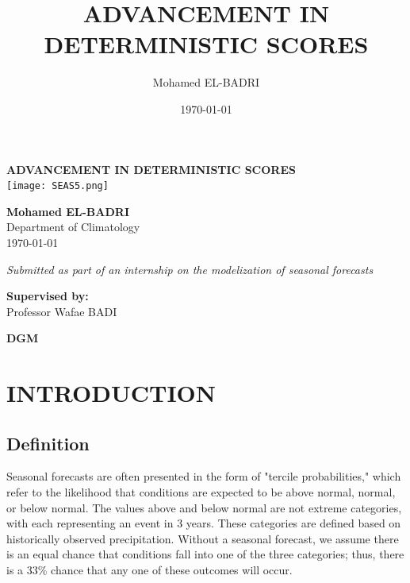 \documentclass[11pt]{article}
\title{\textbf{ADVANCEMENT IN DETERMINISTIC SCORES}}
\author{Mohamed EL-BADRI}
\date{\today}
\begin{document}
\begin{titlepage}
    \centering
    \vspace*{5cm} %
    
    {\Large\textbf{ADVANCEMENT IN DETERMINISTIC SCORES}}\\[1.5cm]
    
    \texttt{[image: SEAS5.png]} %
    
    \vfill
    
    \textbf{\Large Mohamed EL-BADRI}\\[1cm]
    
    \Large Department of Climatology \\[0.3cm]
    
    \Large \today
    
    \vspace*{2cm}
    
\large \textit{Submitted as part of an internship on the modelization of seasonal forecasts}\\[1cm]

    
    \vfill
    
    \large \textbf{Supervised by:} \\
    Professor Wafae BADI\\
    
    \vspace{1cm}
    
    \textbf{DGM}\\
    \vfill
\end{titlepage}

\section{INTRODUCTION}
	\subsection{Definition}
Seasonal forecasts are often presented in the form of "tercile probabilities," which refer to the
likelihood that conditions are expected to be above normal, normal, or below normal. The values above and below normal are not extreme categories, with each representing an event in 3 years. These categories are defined based on historically observed precipitation. Without a seasonal forecast, we assume there is an equal chance that conditions fall into one of the three categories; thus, there is a 33\% chance that any one of these outcomes will occur.
\end{document}
